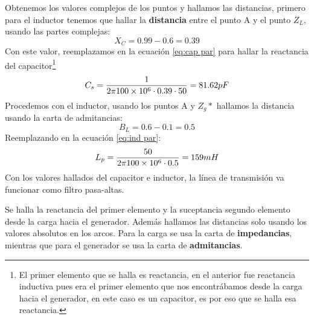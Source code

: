 \documentclass[
	12pt, %
	fleqn, %
	a4paper, %
	oneside, %
]{LegrandOrangeBook}
\begin{document}
\begin{example}
\begin{center}
\end{center}
Obtenemos los valores complejos de los puntos y hallamos las distancias, primero para el inductor tenemos que hallar la \textbf{distancia} entre el punto A y el punto $Z_L$, usando las partes complejas:
\begin{displaymath}
X_C=0.99-0.6=0.39
\end{displaymath}
Con este valor, reemplazamos en la ecuación \ref{eq:cap par} para hallar la reactancia del capacitor\footnote{El primer elemento que se halla es reactancia, en el anterior fue reactancia inductiva pues era el primer elemento que nos encontrábamos desde la carga hacia el generador, en este caso es un capacitor, es por eso que se halla esa reactancia.}
\begin{displaymath}
C_s=\frac{1}{2\pi 100\times 10^{6}\cdot 0.39\cdot 50}=81.62 pF
\end{displaymath}
Procedemos con el inductor, usando los puntos A y $Z_g*$ hallamos la distancia usando la carta de admitancias:
\begin{displaymath}
B_L=0.6-0.1=0.5
\end{displaymath}
Reemplazando en la ecuación \ref{eq:ind par}:
\begin{displaymath}
L_p=\frac{50}{2\pi 100\times 10^{6}\cdot 0.5}=159 mH
\end{displaymath}
Con los valores hallados del capacitor e inductor, la línea de transmisión va funcionar como filtro pasa-altas.
\end{example}
\begin{remark}
Se halla la reactancia del primer elemento y la suceptancia segundo elemento desde la carga hacia el generador. Además hallamos las distancias solo usando los valores absolutos en los arcos. Para la carga se usa la carta de \textbf{impedancias}, mientras que para el generador se usa la carta de \textbf{admitancias}.
\end{remark}
\end{document}
